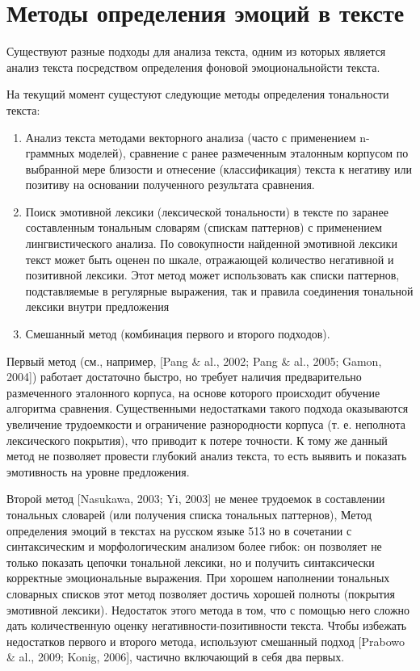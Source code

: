 \section{Методы определения эмоций в тексте}

Существуют разные подходы для анализа текста, одним из которых является анализ текста 
посредством определения фоновой эмоциональнойсти текста. 

На текущий момент сущестуют следующие методы определения тональности текста:
\begin{enumerate}
  \item Анализ текста методами векторного анализа (часто с применением n-граммных моделей), сравнение с ранее размеченным эталонным корпусом по выбранной мере близости и отнесение (классификация) текста к негативу или позитиву на основании полученного результата сравнения.
  \item Поиск эмотивной лексики (лексической тональности) в тексте по заранее составленным тональным словарям (спискам паттернов) с применением лингвистического анализа. По совокупности найденной эмотивной лексики текст может быть оценен по шкале, отражающей количество негативной и позитивной лексики. Этот метод может использовать как списки паттернов, подставляемые в регулярные выражения, так и правила соединения тональной лексики внутри предложения
  \item Смешанный метод (комбинация первого и второго подходов).
\end{enumerate}

Первый метод (см., например, [Pang \& al., 2002; Pang \& al., 2005; Gamon,
2004]) работает достаточно быстро, но требует наличия предварительно размеченного эталонного корпуса, на основе которого происходит обучение алгоритма сравнения. 
Существенными недостатками такого подхода оказываются увеличение трудоемкости и ограничение разнородности корпуса (т. е.
неполнота лексического покрытия), что приводит к потере точности. К тому же
данный метод не позволяет провести глубокий анализ текста, то есть выявить
и показать эмотивность на уровне предложения.

Второй метод [Nasukawa, 2003; Yi, 2003] не менее трудоемок в составлении тональных словарей (или получения списка тональных паттернов),
Метод определения эмоций в текстах на русском языке 513
но в сочетании с синтаксическим и морфологическим анализом более гибок:
он позволяет не только показать цепочки тональной лексики, но и получить
синтаксически корректные эмоциональные выражения. При хорошем наполнении тональных словарных списков этот метод позволяет достичь хорошей
полноты (покрытия эмотивной лексики).
Недостаток этого метода в том, что с помощью него сложно дать количественную оценку негативности-позитивности текста. 
Чтобы избежать недостатков первого и второго метода, используют смешанный подход [Prabowo \&
al., 2009; Konig, 2006], частично включающий в себя два первых.

